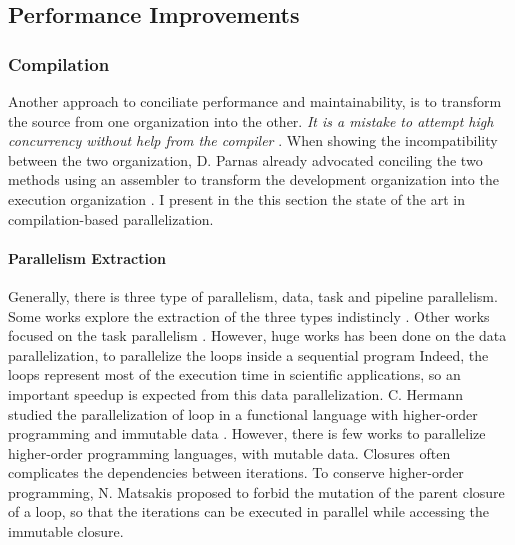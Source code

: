 
\subsection{Performance Improvements}


\subsubsection{Compilation}


Another approach to conciliate performance and maintainability, is to transform the source from one organization into the other.
\textit{It is a mistake to attempt high concurrency without help from the compiler} \cite{Behren2003}.
When showing the incompatibility between the two organization, D. Parnas already advocated conciling the two methods using an assembler to transform the development organization into the execution organization \cite{Parnas1972}.
I present in the this section the state of the art in compilation-based parallelization.


\paragraph{Parallelism Extraction}

Generally, there is three type of parallelism, data, task and pipeline parallelism.
Some works explore the extraction of the three types indistincly \cite{Li2012}.
Other works focused on the task parallelism \cite{Rinard1996}.
However, huge works has been done on the data parallelization, to parallelize the loops inside a sequential program \cite{Mauras1989,Amarasinghe1995,Yuki2013,Banerjee2013,Radoi2014}
Indeed, the loops represent most of the execution time in scientific applications, so an important speedup is expected from this data parallelization.
C. Hermann studied the parallelization of loop in a functional language with higher-order programming and immutable data \cite{Herrmann2000}.
However, there is few works to parallelize higher-order programming languages, with mutable data.
Closures often complicates the dependencies between iterations.
To conserve higher-order programming, N. Matsakis proposed to forbid the mutation of the parent closure of a loop, so that the iterations can be executed in parallel while accessing the immutable closure\cite{Matsakis2012a}.

